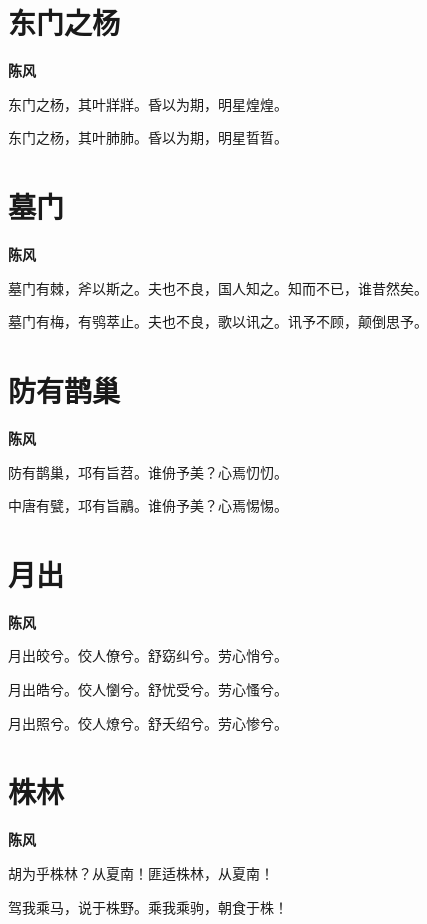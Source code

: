 \documentclass[12pt,a4paper]{ctexbook}
\begin{document}
\section{东门之杨}
\textbf{陈风}\par\vspace{0.5em}
东门之杨，其叶牂牂。昏以为期，明星煌煌。\par
东门之杨，其叶肺肺。昏以为期，明星晢晢。\par

\section{墓门}
\textbf{陈风}\par\vspace{0.5em}
墓门有棘，斧以斯之。夫也不良，国人知之。知而不已，谁昔然矣。\par
墓门有梅，有鸮萃止。夫也不良，歌以讯之。讯予不顾，颠倒思予。\par

\section{防有鹊巢}
\textbf{陈风}\par\vspace{0.5em}
防有鹊巢，邛有旨苕。谁侜予美？心焉忉忉。\par
中唐有甓，邛有旨鷊。谁侜予美？心焉惕惕。\par

\section{月出}
\textbf{陈风}\par\vspace{0.5em}
月出皎兮。佼人僚兮。舒窈纠兮。劳心悄兮。\par
月出皓兮。佼人懰兮。舒忧受兮。劳心慅兮。\par
月出照兮。佼人燎兮。舒夭绍兮。劳心惨兮。\par

\section{株林}
\textbf{陈风}\par\vspace{0.5em}
胡为乎株林？从夏南！匪适株林，从夏南！\par
驾我乘马，说于株野。乘我乘驹，朝食于株！\par
\end{document}

